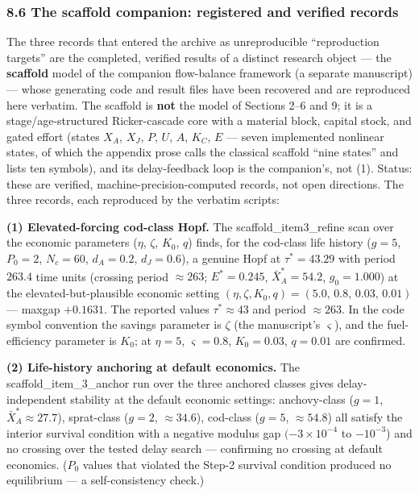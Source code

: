 \documentclass[11pt]{article}
\begin{document}
\subsubsection{8.6 The scaffold companion: registered and verified
records}\label{the-scaffold-companion-registered-and-verified-records}

The three records that entered the archive as unreproducible
``reproduction targets'' are the completed, verified results of a
distinct research object --- the \textbf{scaffold} model of the
companion flow-balance framework (a separate manuscript) --- whose
generating code and result files have been recovered and are reproduced
here verbatim. The scaffold is \textbf{not} the model of Sections 2--6
and 9; it is a stage/age-structured Ricker-cascade core with a material
block, capital stock, and gated effort (states \(X_A\), \(X_J\), \(P\),
\(U\), \(A\), \(K_C\), \(E\) --- seven implemented nonlinear states, of
which the appendix prose calls the classical scaffold ``nine states''
and lists ten symbols), and its delay-feedback loop is the companion's,
not (1). Status: these are verified, machine-precision-computed records,
not open directions. The three records, each reproduced by the verbatim
scripts:

\textbf{(1) Elevated-forcing cod-class Hopf.} The
scaffold\_item3\_refine scan over the economic parameters (\(\eta\),
\(\zeta\), \(K_0\), \(q\)) finds, for the cod-class life history
(\(g = 5\), \(P_0 = 2\), \(N_c = 60\), \(d_A = 0.2\), \(d_J = 0.6\)), a
genuine Hopf at \(\tau^* = 43.29\) with period \(263.4\) time units
(crossing period \(\approx 263\); \(E^* = 0.245\),
\(\bar X_A^* = 54.2\), \(g_0 = 1.000\)) at the elevated-but-plausible
economic setting
\((\eta, \zeta, K_0, q) = (5.0,\, 0.8,\, 0.03,\, 0.01)\) --- maxgap
\(+0.1631\). The reported values \(\tau^* \approx 43\) and period
\(\approx 263\). In the code symbol convention the savings parameter is
\(\zeta\) (the manuscript's \(\varsigma\)), and the fuel-efficiency
parameter is \(K_0\); at \(\eta = 5\), \(\varsigma = 0.8\),
\(K_0 = 0.03\), \(q = 0.01\) are confirmed.

\textbf{(2) Life-history anchoring at default economics.} The
scaffold\_item\_3\_anchor run over the three anchored classes gives
delay-independent stability at the default economic settings:
anchovy-class (\(g = 1\), \(\bar X_A^* \approx 27.7\)), sprat-class
(\(g = 2\), \(\approx 34.6\)), cod-class (\(g = 5\), \(\approx 54.8\))
all satisfy the interior survival condition with a negative modulus gap
\((-3\times10^{-4}\) to \(-10^{-3}\)) and no crossing over the tested
delay search --- confirming no crossing at default economics. (\(P_0\)
values that violated the Step-2 survival condition produced no
equilibrium --- a self-consistency check.)
\end{document}
